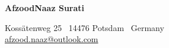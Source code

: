 \documentclass{OpenCV}
\newlength{\hvspace}
\begin{document}
\begin{center}
    \noindent\textbf{\LARGE AfzoodNaaz Surati}
\end{center}
\vspace{\hvspace}
\hrulefill
\vspace{\hvspace}
\begin{center}
    \noindent Kossätenweg 25 \textbullet\ 14476 Potsdam \textbullet\ Germany\\
    \noindent\faEnvelopeO\enskip \href{mailto:afzood.naaz@outlook.com}{afzood.naaz@outlook.com}\enskip
    \textbar\enskip \faPhone\enskip {\color{myred}{+49 1746167199}}\enskip
\end{center}
\vspace{\hvspace}
\vspace{-4pt}
\hrulefill
\vspace{-12pt}













\end{document}
